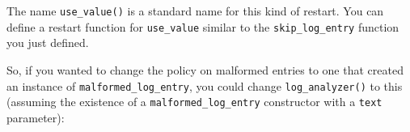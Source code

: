 \begin{Shaded}
\begin{Highlighting}[]
\StringTok{ }
    \NormalTok{(}
  \NormalTok{\}}
  
  \NormalTok{(}
    \NormalTok{(}
     
     
  \NormalTok{)}
\NormalTok{\}}
\end{Highlighting}
\end{Shaded}

The name \texttt{use\_value()} is a standard name for this kind of
restart. You can define a restart function for \texttt{use\_value}
similar to the \texttt{skip\_log\_entry} function you just defined.

\begin{Shaded}
\begin{Highlighting}[]
\StringTok{ }\NormalTok{(}
\end{Highlighting}
\end{Shaded}

So, if you wanted to change the policy on malformed entries to one that
created an instance of \texttt{malformed\_log\_entry}, you could change
\texttt{log\_analyzer()} to this (assuming the existence of a
\texttt{malformed\_log\_entry} constructor with a \texttt{text}
parameter):

\begin{Shaded}
\begin{Highlighting}[]
\StringTok{ }
  \StringTok{ }\NormalTok{()}
  
  \NormalTok{(}
     
      \NormalTok{(}
    \NormalTok{\},}
  \NormalTok{)}
\NormalTok{\}}
\end{Highlighting}
\end{Shaded}

